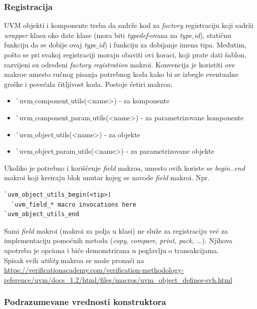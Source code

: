 \subsubsection{Registracija}

UVM objekti i komponente treba da sadrže kod za \emph{factory} registraciju koji
sadrži \emph{wrapper} klasu oko date klase (mora biti \emph{typedef}-ovana na
\emph{type\(\_\)id}), statičnu funkciju da se dobije ovaj \emph{type\(\_\)id}) i
funkciju za dobijanje imena tipa. Međutim, pošto se pri svakoj registraciji
moraju obaviti ovi koraci, koji prate dati šablon, razvijeni su određeni
\emph{factory registration} makroi. Konvencija je koristiti ove makroe umesto
ručnog pisanja potrebnog koda kako bi se izbegle eventualne greške i povećala
čitljivost koda. Postoje četiri makroa:

\begin{itemize}
\item \`\ uvm\(\_\)component\(\_\)utils(\textless name\textgreater ) - za komponente
\item \`\ uvm\(\_\)component\(\_\)param\(\_\)utils(\textless name\textgreater ) -
  za parametrizovane komponente
\item \`\ uvm\(\_\)object\(\_\)utils(\textless name\textgreater ) - za objekte
\item \`\ uvm\(\_\)object\(\_\)param\(\_\)utils(\textless name\textgreater ) - za
  parametrizovane objekte
\end{itemize}

Ukoliko je potrebno i korišćenje \emph{field} makroa, umesto ovih koriste se
\emph{begin..end} makroi koji kreiraju blok unutar kojeg se navode \emph{field}
makroi. Npr.

\begin{lstlisting}
`uvm_object_utils_begin(<tip>)
  `uvm_field_* macro invocations here
`uvm_object_utils_end
\end{lstlisting}

Sami \emph{field} makroi (makroi za polja u klasi) ne služe za registraciju već
za implementaciju pomoćnih metoda (\emph{copy}, \emph{compare}, \emph{print},
\emph{pack}, ...). Njihova upotreba je opciona i biće demonstrirana u poglavlju
o transakcijama.\\

Spisak svih \emph{utility} makroa se može pronaći na
\url{https://verificationacademy.com/verification-methodology-reference/uvm/docs_1.2/html/files/macros/uvm_object_defines-svh.html}

\subsubsection{Podrazumevane vrednosti konstruktora}


